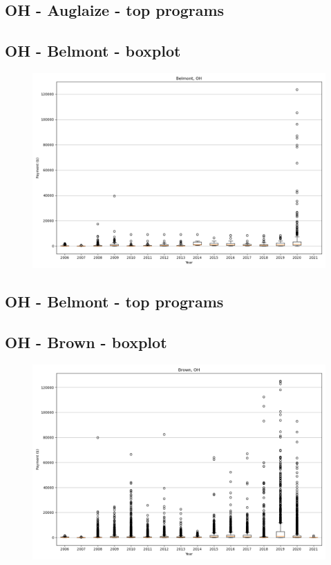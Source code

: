 \subsection*{OH - Auglaize - top programs}

\newpage
\subsection*{OH - Belmont - boxplot}
\begin{figure}[h]
\centering
\includegraphics[width=7in]{../output/boxplots/counties/Belmont-OH_boxplot.png}
\end{figure}


\subsection*{OH - Belmont - top programs}

\newpage
\subsection*{OH - Brown - boxplot}
\begin{figure}[h]
\centering
\includegraphics[width=7in]{../output/boxplots/counties/Brown-OH_boxplot.png}
\end{figure}


